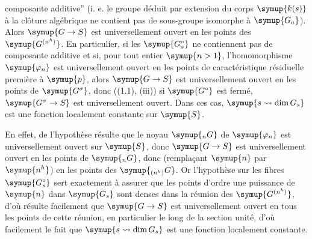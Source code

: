 composante additive'' (i. e. le groupe déduit par extension du corps $\symup{k(s)}$ à la
clôture algébrique ne contient pas de sous-groupe isomorphe à $\symup{G_a}$). Alors $\symup{G\to  S}$ est universellement ouvert en les
points des $\symup{G^{(n^h)}}$. En particulier, si les $\symup{G_s^\circ}$ ne contiennent pas
de composante additive et si, pour tout entier $\symup{n>1}$, l'homomorphisme
$\symup{\varphi_n}$ est universellement ouvert en les points de caractéristique
résiduelle première à $\symup{p}$,
alors $\symup{G\to  S}$ est universellement ouvert en les points de
$\symup{G^\sigma}$, donc ((1.1), (iii)) si $\symup{G^\circ}$ est fermé,
$\symup{G^\sigma\to  S}$ est universellement ouvert. Dans ces cas,
$\symup{s\rightsquigarrow\dim G_s}$ est une fonction localement constante sur $\symup{S}$.

En effet, de l'hypothèse résulte que le noyau $\symup{{}_nG}$ de $\symup{\varphi_n}$ est
universellement ouvert sur $\symup{S}$, donc $\symup{G\to  S}$ est universellement
ouvert en les points de $\symup{{}_nG}$, donc (remplaçant $\symup{n}$ par $\symup{n^h}$) en les points
des $\symup{{}_{(n^h)}G}$. Or l'hypothèse sur les fibres $\symup{G_s^\circ}$ sert exactement à assurer que les points d'ordre une puissance de $\symup{n}$
dans $\symup{G_s}$ sont denses dans la réunion des $\symup{G^{(n^h)}}$, d'où résulte facilement que
$\symup{G\to  S}$ est universellement ouvert en tous les points de cette
réunion, en particulier le long de la section unité, d'où facilement le fait
que $\symup{s\rightsquigarrow\dim G_s}$ est une fonction localement constante.

